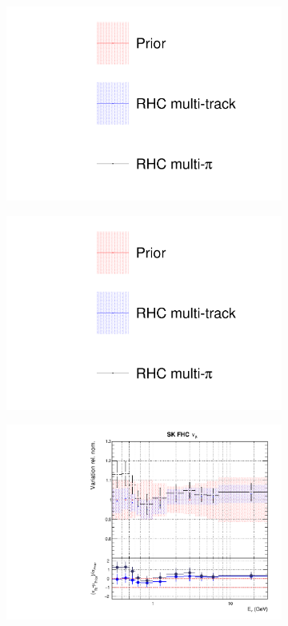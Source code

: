 \begin{figure}[t]
\centering
\begin{subfigure}{0.3\textwidth}
  \centering
  \includegraphics[width=1.0\linewidth, trim={5mm  130mm 0mm 10mm}, clip]{figs/rhcmpdat248_leg}	
\end{subfigure}
\begin{subfigure}{0.3\textwidth}
  \centering
  \includegraphics[width=1.0\linewidth, trim={5mm  0mm 0mm 70mm}, clip]{figs/rhcmpdat248_leg}	
\end{subfigure}
\begin{subfigure}{0.42\textwidth}
  \centering
  \includegraphics[width=0.75\linewidth]{figs/rhcmpdat28flux_8}

\end{subfigure}
\end{figure}
